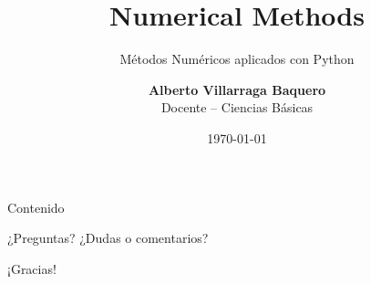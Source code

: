 \documentclass[../main.tex]{subfiles}
\title[Numerical Methods]{\Large \textbf{Numerical Methods}}
\subtitle{\large Métodos Numéricos aplicados con Python}
\author{
  \textbf{Alberto Villarraga Baquero} \\
  \small Docente – Ciencias Básicas 
}
\institute{
  \large Universidad Santo Tomas \\
  Facultad de Ciencias Básicas
}
\date{\today}
\begin{document}
\maketitle
\begin{frame}{Contenido}
\tableofcontents
\end{frame}



%

%
%
%
%
%
%


\begin{frame}{¿Preguntas?}
\centering
\Large
¿Dudas o comentarios?
\end{frame}

\begin{frame}[standout]
\Huge ¡Gracias!
\end{frame}
\end{document}
